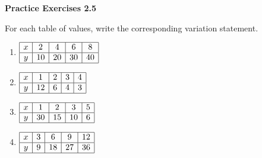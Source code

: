\vspace{0.3ex}
\noindent\textbf{Practice Exercises 2.5}

\vspace{0.2ex}


\noindent For each table of values, write the corresponding variation statement.

\begin{multicols}{2}
\begin{enumerate}[noitemsep, label = \color{blue}\arabic*. ]
    \item 
   $ \begin{array}{|c|c|c|c|c|}
        \hline
        x & 2 & 4 & 6 & 8 \\ \hline
        y & 10 & 20 & 30 & 40 \\ \hline
    \end{array}$
     
    \item 
    $
    \begin{array}{|c|c|c|c|c|}
        \hline
        x & 1 & 2 & 3 & 4 \\ \hline
        y & 12 & 6 & 4 & 3 \\ \hline
    \end{array}
    $
    
    
    \item 
    $
    \begin{array}{|c|c|c|c|c|}
        \hline
        x & 1 & 2 & 3 & 5 \\ \hline
        y & 30 & 15 & 10 & 6 \\ \hline
    \end{array}
    $
    
    \item 
    $
    \begin{array}{|c|c|c|c|c|}
        \hline
        x & 3 & 6 & 9 & 12 \\ \hline
        y & 9 & 18 & 27 & 36 \\ \hline
    \end{array}
    $
    

\end{enumerate}
\end{multicols}
